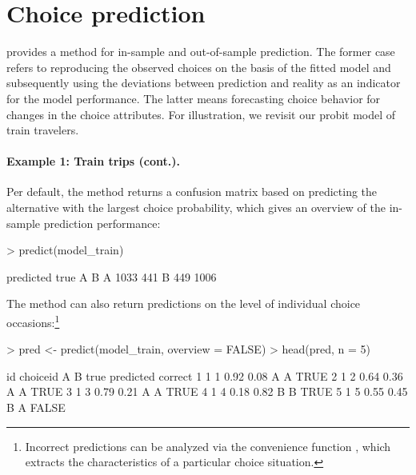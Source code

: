\documentclass[article,shortnames]{jss}
\newcommand{\fct}[1]{\code{#1()}}
\begin{document}
\newpage

\section{Choice prediction} \label{sec:choice_prediction}

 provides a \fct{predict} method for in-sample and out-of-sample prediction. The former case refers to reproducing the observed choices on the basis of the fitted model and subsequently using the deviations between prediction and reality as an indicator for the model performance. The latter means forecasting choice behavior for changes in the choice attributes. For illustration, we revisit our probit model of train travelers.

\paragraph{Example 1: Train trips (cont.).}

Per default, the \fct{predict} method returns a confusion matrix based on predicting the alternative with the largest choice probability, which gives an overview of the in-sample prediction performance:

\begin{Schunk}
\begin{Sinput}
> predict(model_train)
\end{Sinput}
\begin{Soutput}
    predicted
true    A    B
   A 1033  441
   B  449 1006
\end{Soutput}
\end{Schunk}

The method can also return predictions on the level of individual choice occasions:\footnote{Incorrect predictions can be analyzed via the convenience function \fct{get\_cov}, which extracts the characteristics of a particular choice situation.}

\begin{Schunk}
\begin{Sinput}
> pred <- predict(model_train, overview = FALSE)
> head(pred, n = 5)
\end{Sinput}
\begin{Soutput}
  id choiceid    A    B true predicted correct
1  1        1 0.92 0.08    A         A    TRUE
2  1        2 0.64 0.36    A         A    TRUE
3  1        3 0.79 0.21    A         A    TRUE
4  1        4 0.18 0.82    B         B    TRUE
5  1        5 0.55 0.45    B         A   FALSE
\end{Soutput}
\end{Schunk}
\end{document}
